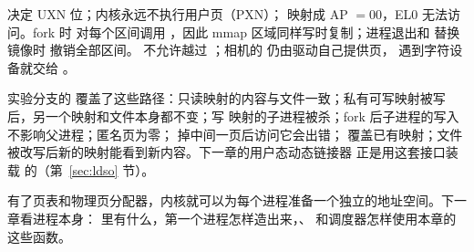  决定 UXN 位；内核永远不执行用户页（PXN）； 映射成 AP $=00$，EL0 无法访问。fork 时  对每个区间调用 ，因此 mmap 区域同样写时复制；进程退出和  替换镜像时  撤销全部区间。 不允许越过 ；相机的  仍由驱动自己提供页， 遇到字符设备就交给 。

实验分支的  覆盖了这些路径：只读映射的内容与文件一致；私有可写映射被写后，另一个映射和文件本身都不变；写  映射的子进程被杀；fork 后子进程的写入不影响父进程；匿名页为零； 掉中间一页后访问它会出错； 覆盖已有映射；文件被改写后新的映射能看到新内容。下一章的用户态动态链接器  正是用这套接口装载  的（第~\ref{sec:ldso} 节）。

有了页表和物理页分配器，内核就可以为每个进程准备一个独立的地址空间。下一章看进程本身： 里有什么，第一个进程怎样造出来，、 和调度器怎样使用本章的这些函数。
